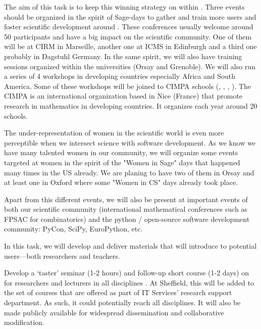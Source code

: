 \begin{workpackage}
\begin{tasklist}
\begin{task}[title=Dissemination: reaching users, lead=PS, partners={UB,USH}, id=dissemination]
The aim of this task is to keep this winning strategy on within \TheProject. Three events should be organized in the spirit of Sage-days to gather and train more users and foster scientific development around \TheProject. These conferences usually welcome around 50 participants and have a big impact on the scientific community. One of them will be at CIRM in Marseille, another one at ICMS in Edinburgh and a third one probably in Dagstuhl Germany. In the same spirit, we will also have training sessions organized within the universities (Orsay and Grenoble). We will also run a series of 4 workshops in developing countries especially Africa and South America. Some of these workshops will be joined to CIMPA schools (, , , ).
The CIMPA is an international organization based in Nice (France) that promote
research in mathematics in developing countries. It organizes each year around
20 schools.

The under-representation of women in the scientific world is even more perceptible when we intersect science with software development. As we know we have many talented women in our community, we will organize some events targeted at women in the spirit of the "Women in Sage" days that happened many times in the US already. We are planing to have two of them in Orsay and at least one in Oxford where some "Women in CS" days already took place.

Apart from this different events, we will also be present at important events of both our scientific community (international mathematical conferences such as FPSAC for combinatorics) and the python / open-source software development community: PyCon, SciPy, EuroPython, etc.


\end{task}


\begin{task}[title=Introduce \TheProject to researchers and teachers, id=project-intro,lead=USH,PM=8]

In this task, we will develop and deliver materials that will
introduce \TheProject to potential users---both researchers and
teachers.

Develop a `taster' seminar (1-2 hours) and follow-up short course (1-2
days) on \TheProject for researchers and lecturers in all disciplines
. At Sheffield, this will be added to
the set of courses that are offered as part of IT Services' research
support department. As such, it could potentially reach all
disciplines. It will also be made publicly available for widespread
dissemination and collaborative modification.


\end{task}
\end{tasklist}
\end{workpackage}
